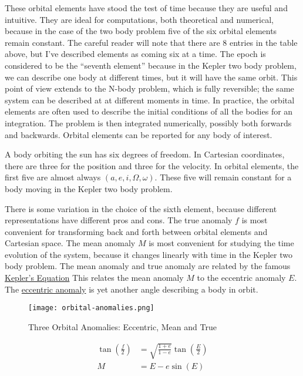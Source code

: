 These orbital elements have stood the test of time because they are useful and intuitive.
They are ideal for computations, both theoretical and numerical, because in the case of the two body problem five of the six orbital elements remain constant.
The careful reader will note that there are 8 entries in the table above, but I've described elements as coming six at a time.
The epoch is considered to be the ``seventh element'' because in the Kepler two body problem, we can describe one body at different times, but it will have the same orbit.
This point of view extends to the N-body problem, which is fully reversible; the same system can be described at at different moments in time.
In practice, the orbital elements are often used to describe the initial conditions of all the bodies for an integration.
The problem is then integrated numerically, possibly both forwards and backwards.
Orbital elements can be reported for any body of interest.

A body orbiting the sun has six degrees of freedom.  
In Cartesian coordinates, there are three for the position and three for the velocity.
In orbital elements, the first five are almost always $(a, e, i, \Omega, \omega)$.
These five will remain constant for a body moving in the Kepler two body problem.

There is some variation in the choice of the sixth element, because different representations have different pros and cons.
The true anomaly $f$ is most convenient for transforming back and forth between orbital elements and Cartesian space.
The mean anomaly $M$ is most convenient for studying the time evolution of the system, because it changes linearly with time in the Kepler two body problem.
The mean anomaly and true anomaly are related by the famous 
\href{https://en.wikipedia.org/wiki/Kepler\%27s_equation}{Kepler's Equation}
This relates the mean anomaly $M$ to the eccentric anomaly $E$.
The \href{https://en.wikipedia.org/wiki/Eccentric_anomaly}{eccentric anomaly} is yet another angle describing a body in orbit.
\begin{figure}
\begin{center}
\texttt{[image: orbital-anomalies.png]}
\caption{Three Orbital Anomalies: Eccentric, Mean and True}
\end{center}
\end{figure}

\begin{align*}
\tan \left(\frac{f}{2} \right) &= \sqrt{\frac{1+e}{1-e}} \tan \left( \frac{E}{2} \right) \\
M &= E - e \sin(E)
\end{align*}
 
